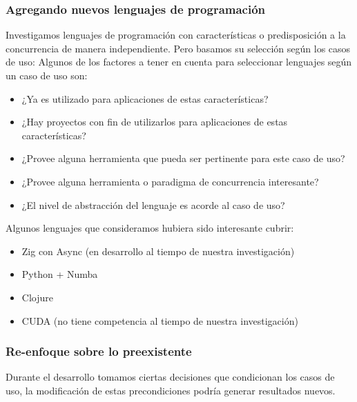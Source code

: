 \documentclass[11pt]{article}
\let\Oldsubsubsection\subsubsection
\renewcommand{\subsubsection}{\FloatBarrier\Oldsubsubsection}
\begin{document}
\subsubsection{Agregando nuevos lenguajes de programación}

Investigamos lenguajes de programación con características o predisposición a la concurrencia de manera independiente. Pero basamos su selección según los casos de uso:
Algunos de los factores a tener en cuenta para seleccionar lenguajes según un caso de uso son:

\begin{itemize}
    \item ¿Ya es utilizado para aplicaciones de estas características?
    \item ¿Hay proyectos con fin de utilizarlos para aplicaciones de estas características?
    \item ¿Provee alguna herramienta que pueda ser pertinente para este caso de uso?
    \item ¿Provee alguna herramienta o paradigma de concurrencia interesante?
    \item ¿El nivel de abstracción del lenguaje es acorde al caso de uso?
\end{itemize}

Algunos lenguajes que consideramos hubiera sido interesante cubrir:

\begin{itemize}
    \item Zig con Async (en desarrollo al tiempo de nuestra investigación)
    \item Python + Numba
    \item Clojure
    \item CUDA (no tiene competencia al tiempo de nuestra investigación)
\end{itemize}

\subsubsection{Re-enfoque sobre lo preexistente}

Durante el desarrollo tomamos ciertas decisiones que condicionan los casos de uso, la modificación de estas precondiciones podría generar resultados nuevos.
\end{document}
